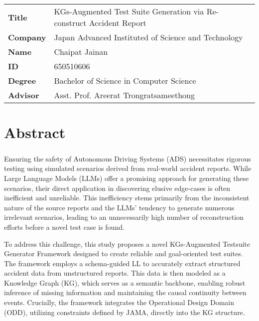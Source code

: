 \documentclass[a4paper,12pt]{report}
\begin{document}
\newpage
{
\cleardoublepage%
\let\clearpage\relax%
\noindent
\begin{tabular}{l l c}
    \textbf{Title} & KGs-Augmented Test Suite Generation via Re-construct Accident Report & \vspace{0.2cm}\\
    \textbf{Company} & Japan Advanced Instituted of Science and Technology & \vspace{0.2cm}\\
    \textbf{Name} & Chaipat Jainan & \vspace{0.2cm}\\
    \textbf{ID} & 650510606 & \vspace{0.2cm}\\
    \textbf{Degree} & Bachelor of Science in Computer Science & \vspace{0.2cm}\\
    \textbf{Advisor} & Asst. Prof. Areerat Trongratsameethong & \vspace{0.2cm}\\
\end{tabular}

\chapter*{Abstract}

\paragraph{}
Ensuring the safety of Autonomous Driving Systems (ADS) necessitates rigorous testing using simulated scenarios derived from real-world accident reports. While Large Language Models (LLMs) offer a promising approach for generating these scenarios, their direct application in discovering elusive edge-cases is often inefficient and unreliable. This inefficiency stems primarily from the inconsistent nature of the source reports and the LLMs' tendency to generate numerous irrelevant scenarios, leading to an unnecessarily high number of reconstruction efforts before a novel test case is found.

To address this challenge, this study proposes a novel KGs-Augmented Testsuite Generator Framework designed to create reliable and goal-oriented test suites. The framework employs a schema-guided LL to accurately extract structured accident data from unstructured reports. This data is then modeled as a Knowledge Graph (KG), which serves as a semantic backbone, enabling robust inference of missing information and maintaining the causal continuity between events. Crucially, the framework integrates the Operational Design Domain (ODD), utilizing constraints defined by JAMA, directly into the KG structure.

}
\end{document}
